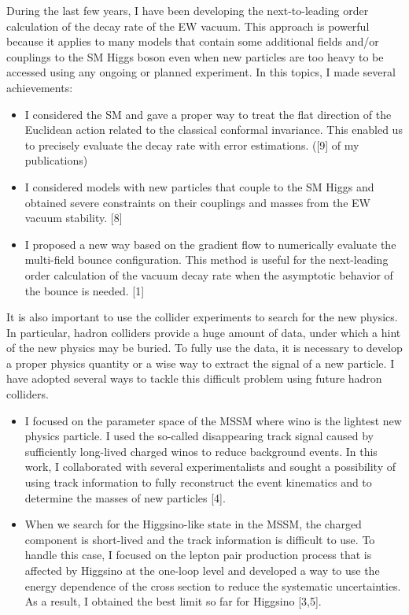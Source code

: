 \documentclass[12pt,notitlepage]{article}
\begin{document}
During the last few years, I have been developing the next-to-leading order calculation of the decay rate of the EW vacuum.
This approach is powerful because it applies to many models that contain some additional fields and/or couplings to the SM Higgs boson even when new particles are too heavy to be accessed using any ongoing or planned experiment.
In this topics, I made several achievements:
\vspace{-1.3mm}
\begin{itemize}
  \setlength{\parskip}{0mm}
  \setlength{\itemsep}{1mm}
  \item
    I considered the SM and gave a proper way to treat the flat direction of the Euclidean action related to the classical conformal invariance.
    This enabled us to precisely evaluate the decay rate with error estimations. ([9] of my publications)
  \item
    I considered models with new particles that couple to the SM Higgs and obtained severe constraints on their couplings and masses from the EW vacuum stability. [8]
  \item
    I proposed a new way based on the gradient flow to numerically evaluate the multi-field bounce configuration.
    This method is useful for the next-leading order calculation of the vacuum decay rate when the asymptotic behavior of the bounce is needed. [1]
\end{itemize}

It is also important to use the collider experiments to search for the new physics.
In particular, hadron colliders provide a huge amount of data, under which a hint of the new physics may be buried.
To fully use the data, it is necessary to develop a proper physics quantity or a wise way to extract the signal of a new particle.
I have adopted several ways to tackle this difficult problem using future hadron colliders.
\vspace{-1.3mm}
\begin{itemize}
  \setlength{\parskip}{0mm}
  \setlength{\itemsep}{1mm}
  \item
    I focused on the parameter space of the MSSM where wino is the lightest new physics particle.
    I used the so-called disappearing track signal caused by sufficiently long-lived charged winos to reduce background events.
    In this work, I collaborated with several experimentalists and sought a possibility of using track information to fully reconstruct the event kinematics and to determine the masses of new particles [4].
  \item
    When we search for the Higgsino-like state in the MSSM, the charged component is short-lived and the track information is difficult to use.
    To handle this case, I focused on the lepton pair production process that is affected by Higgsino at the one-loop level and developed a way to use the energy dependence of the cross section to reduce the systematic uncertainties.
    As a result, I obtained the best limit so far for Higgsino [3,5].
\end{itemize}
\end{document}
